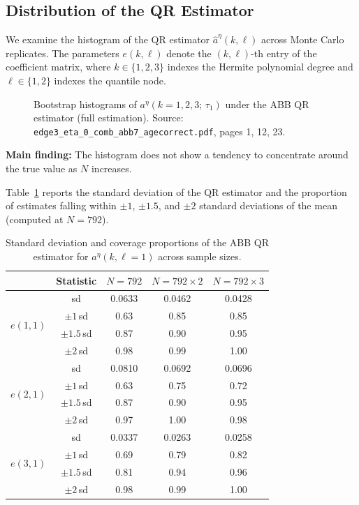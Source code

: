 \documentclass[12pt]{article}
\begin{document}
\subsection{Distribution of the QR Estimator}

We examine the histogram of the QR estimator $\hat a^\eta(k,\ell)$ across
Monte Carlo replicates.
The parameters $e(k,\ell)$ denote the $(k,\ell)$-th entry of the
coefficient matrix, where $k\in\{1,2,3\}$ indexes the Hermite polynomial
degree and $\ell\in\{1,2\}$ indexes the quantile node.

\begin{figure}[H]
\centering
\caption{Bootstrap histograms of $a^\eta(k=1,2,3;\,\tau_1)$
under the ABB QR estimator (full estimation).
Source: \texttt{edge3\_eta\_0\_comb\_abb7\_agecorrect.pdf}, pages 1, 12, 23.}
\label{fig:abb_hist_full}
\end{figure}

\textbf{Main finding:} The histogram does not show a tendency to concentrate
around the true value as $N$ increases.

Table~\ref{tab:abb_sd} reports the standard deviation of the QR estimator
and the proportion of estimates falling within $\pm1$, $\pm1.5$, and $\pm2$
standard deviations of the mean (computed at $N=792$).

\begin{table}[H]
\centering
\caption{Standard deviation and coverage proportions of the ABB QR estimator
for $a^\eta(k,\ell=1)$ across sample sizes.}
\label{tab:abb_sd}
\begin{tabular}{lcccc}
\toprule
 & Statistic & $N=792$ & $N=792\times2$ & $N=792\times3$ \\
\midrule
\multirow{4}{*}{$e(1,1)$}
 & sd           & 0.0633 & 0.0462 & 0.0428 \\
 & $\pm1\,$sd   & 0.63   & 0.85   & 0.85   \\
 & $\pm1.5\,$sd & 0.87   & 0.90   & 0.95   \\
 & $\pm2\,$sd   & 0.98   & 0.99   & 1.00   \\
\midrule
\multirow{4}{*}{$e(2,1)$}
 & sd           & 0.0810 & 0.0692 & 0.0696 \\
 & $\pm1\,$sd   & 0.63   & 0.75   & 0.72   \\
 & $\pm1.5\,$sd & 0.87   & 0.90   & 0.95   \\
 & $\pm2\,$sd   & 0.97   & 1.00   & 0.98   \\
\midrule
\multirow{4}{*}{$e(3,1)$}
 & sd           & 0.0337 & 0.0263 & 0.0258 \\
 & $\pm1\,$sd   & 0.69   & 0.79   & 0.82   \\
 & $\pm1.5\,$sd & 0.81   & 0.94   & 0.96   \\
 & $\pm2\,$sd   & 0.98   & 0.99   & 1.00   \\
\bottomrule
\end{tabular}
\end{table}
\end{document}
